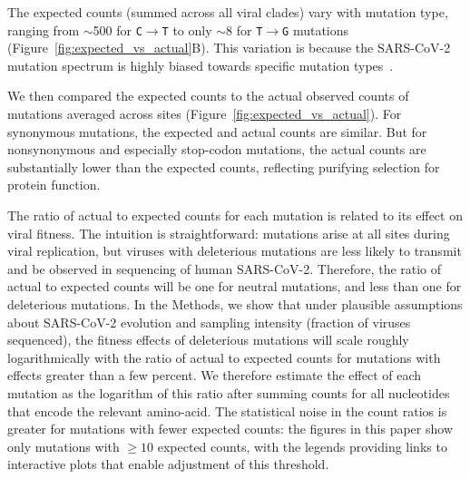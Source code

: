 \documentclass[9pt,twocolumn,twoside]{gsajnl_modified}
\begin{document}
The expected counts (summed across all viral clades) vary with mutation type, ranging from $\sim$500 for \texttt{C$\rightarrow$T} to only $\sim$8 for \texttt{T$\rightarrow$G} mutations (Figure~\ref{fig:expected_vs_actual}B).
This variation is because the SARS-CoV-2 mutation spectrum is highly biased towards specific mutation types~\citep{bloom2022evolution,ruis2022mutational,de2021mutation}.

We then compared the expected counts to the actual observed counts of mutations averaged across sites (Figure~\ref{fig:expected_vs_actual}).
For synonymous mutations, the expected and actual counts are similar.
But for nonsynonymous and especially stop-codon mutations, the actual counts are substantially lower than the expected counts, reflecting purifying selection for protein function.

The ratio of actual to expected counts for each mutation is related to its effect on viral fitness.
The intuition is straightforward: mutations arise at all sites during viral replication, but viruses with deleterious mutations are less likely to transmit and be observed in sequencing of human SARS-CoV-2.
Therefore, the ratio of actual to expected counts will be one for neutral mutations, and less than one for deleterious mutations.
In the Methods, we show that under plausible assumptions about SARS-CoV-2 evolution and sampling intensity (fraction of viruses sequenced), the fitness effects of deleterious mutations will scale roughly logarithmically with the ratio of actual to expected counts for mutations with effects greater than a few percent.
We therefore estimate the effect of each mutation as the logarithm of this ratio after summing counts for all nucleotides that encode the relevant amino-acid.
The statistical noise in the count ratios is greater for mutations with fewer expected counts: the figures in this paper show only mutations with $\ge10$ expected counts, with the legends providing links to interactive plots that enable adjustment of this threshold.
\end{document}
